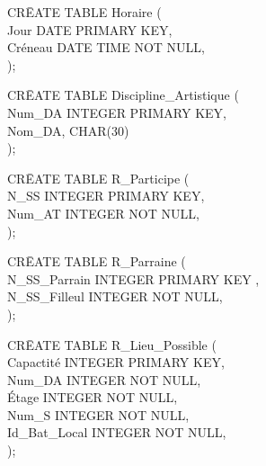 \documentclass[a4paper,10.5pt]{report}
\begin{document}
		\begin{tabbing}
			CR\=EATE TABLE Horaire (\\
			\> Jour DATE PRIMARY KEY,\\
			\> Créneau DATE TIME NOT NULL,\\);
		\end{tabbing}
		\begin{tabbing}
			CR\=EATE TABLE Discipline\_Artistique (\\
			\> Num\_DA INTEGER PRIMARY KEY,\\
			\> Nom\_DA, CHAR(30)\\);
		\end{tabbing}
		\begin{tabbing}
			CR\=EATE TABLE R\_Participe (\\
			\> N\_SS INTEGER PRIMARY KEY,\\
			\> Num\_AT INTEGER NOT NULL,\\);
		\end{tabbing}
		\begin{tabbing}
			CR\=EATE TABLE R\_Parraine (\\
			\> N\_SS\_Parrain INTEGER PRIMARY KEY ,\\
			\> N\_SS\_Filleul INTEGER NOT NULL,\\);
		\end{tabbing}
		\begin{tabbing}
			CR\=EATE TABLE R\_Lieu\_Possible (\\
			\> Capactité INTEGER PRIMARY KEY,\\
			\> Num\_DA INTEGER NOT NULL,\\
			\> Étage INTEGER NOT NULL,\\
			\> Num\_S INTEGER NOT NULL,\\
			\> Id\_Bat\_Local INTEGER NOT NULL,\\);
		\end{tabbing}
\end{document}
